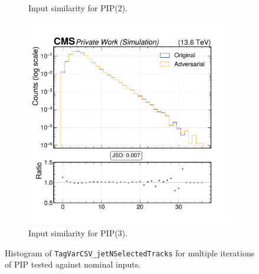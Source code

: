 \begin{figure}[h]
\begin{subfigure}[t]{0.32\textwidth}
    \caption{Input similarity for PIP(2).}
  \end{subfigure}\hfill
  \begin{subfigure}[t]{0.32\textwidth}
    \includegraphics[width=\linewidth]{media/output/features/compare/intprob_3/cmp_global_features_TagVarCSV_jetNSelectedTracks.pdf}
    \caption{Input similarity for PIP(3).}
  \end{subfigure}

  \caption{Histogram of \texttt{TagVarCSV\_jetNSelectedTracks} for multiple iterations of PIP tested against nominal inputs.}
  \label{fig:intprob_input_TagVarCSV_jetNSelectedTracks}
\end{figure}
